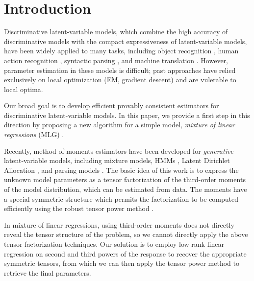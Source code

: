 \section{Introduction}
\label{sec:intro}

Discriminative latent-variable models,
which combine the high accuracy of discriminative models
with the compact expressiveness of latent-variable models,
have been widely applied to many tasks, including
object recognition \cite{quattoni04crf},
human action recognition \cite{wang09crf},
syntactic parsing \cite{petrov08discriminative},
and machine translation \cite{liang06discrimative}.
However, parameter estimation in these models is difficult;
past approaches have relied exclusively on local optimization (EM, 
gradient descent) and are vulerable to local optima.

Our broad goal is to develop efficient provably consistent estimators for
discriminative latent-variable models.
In this paper, we provide a first step in this 
direction by proposing a new algorithm for a simple model,
\emph{mixture of linear regressions} (MLG) \cite{VieleTong2002}.

Recently, method of moments estimators have been developed for
\emph{generative} latent-variable models, including
mixture models, HMMs \cite{AnandkumarHsuKakade2012},
Latent Dirichlet Allocation \cite{anandkumar12lda},
and parsing models \cite{hsu12identifiability}.
The basic idea of this work is to express
the unknown model parameters as a tensor factorization
of the third-order moments of the model distribution, which
can be estimated from data.
The moments have a special symmetric structure
which permits the factorization to be computed efficiently using the robust
tensor power method \cite{AnandkumarGeHsu2012}.

In mixture of linear regressions, using third-order moments does not
directly reveal the tensor structure of the problem, so we cannot
directly apply the above tensor factorization techniques.  Our solution
is to employ low-rank linear regression
\cite{NegahbanWainwright2009,Tomioka2011} on second and third powers of
the response to recover the appropriate symmetric tensors, from which we
can then apply the tensor power method to retrieve the final parameters.

